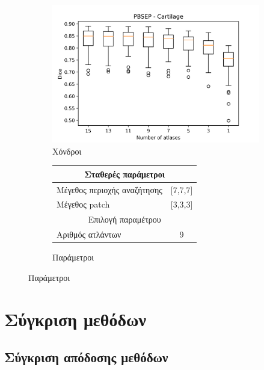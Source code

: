\documentclass{beamer}
\begin{document}
\begin{frame}
\begin{figure}[H]
    \begin{subfigure}[b]{0.42\linewidth}
    \includegraphics[width=\linewidth]{PBSEP_Number_of_atlases_Cartilage_plot.png}
    \caption{Χόνδροι}
    \end{subfigure}
    \begin{subfigure}[b]{0.42\linewidth}
        \begin{tabular}[t]{|l|c|} 
            \multicolumn{2}{c}{\footnotesize Σταθερές παράμετροι} \\
            \hline
            \footnotesize Μέγεθος περιοχής αναζήτησης & \footnotesize  [7,7,7] \\ 
            \hline
            \footnotesize Μέγεθος patch & \footnotesize [3,3,3] \\
            \hline
            \multicolumn{2}{c}{\footnotesize Επιλογή παραμέτρου} \\
            \hline
            \footnotesize Αριθμός ατλάντων & \footnotesize 9 \\ 
            \hline
        \end{tabular}
    \caption{Παράμετροι}
    \end{subfigure}
\end{figure}

\end{frame}


\section{Σύγκριση μεθόδων}
\subsection{Σύγκριση απόδοσης μεθόδων}
\end{document}

